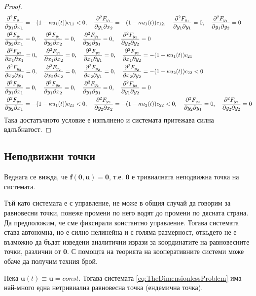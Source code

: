 \begin{proof}
{\begin{align*}
    &\pdv{F_{y_1}}{y_1}{x_1} = -(1-\kappa u_1(t))c_{11} < 0, \quad
    \pdv{F_{y_1}}{y_1}{x_2} = -(1-\kappa u_1(t))c_{12}, \quad
    \pdv{F_{y_1}}{y_1}{y_1} = 0, \quad
    \pdv{F_{y_1}}{y_1}{y_2} = 0 \\
    &\pdv{F_{y_1}}{y_2}{x_1} = 0, \quad
    \pdv{F_{y_1}}{y_2}{x_2} = 0, \quad
    \pdv{F_{y_1}}{y_2}{y_1} = 0, \quad
    \pdv{F_{y_1}}{y_2}{y_2} = 0 \\
    &\pdv{F_{y_2}}{x_1}{x_1} = 0, \quad
    \pdv{F_{y_2}}{x_1}{x_2} = 0, \quad
    \pdv{F_{y_2}}{x_1}{y_1} = 0, \quad
    \pdv{F_{y_2}}{x_1}{y_2} = -(1-\kappa u_1(t)) c_{21} \\
    &\pdv{F_{y_2}}{x_2}{x_1} = 0, \quad
    \pdv{F_{y_2}}{x_2}{x_2} = 0, \quad
    \pdv{F_{y_2}}{x_2}{y_1} = 0, \quad
    \pdv{F_{y_2}}{x_2}{y_2} = -(1-\kappa u_2(t)) c_{22} < 0 \\
    &\pdv{F_{y_2}}{y_1}{x_1} = 0, \quad
    \pdv{F_{y_2}}{y_1}{x_2} = 0, \quad
    \pdv{F_{y_2}}{y_1}{y_1} = 0, \quad
    \pdv{F_{y_2}}{y_1}{y_2} = 0 \\
    &\pdv{F_{y_2}}{y_2}{x_1} = -(1-\kappa u_1(t)) c_{21} < 0, \quad
    \pdv{F_{y_2}}{y_2}{x_2} = -(1-\kappa u_2(t)) c_{22} < 0, \quad
    \pdv{F_{y_2}}{y_2}{y_1} = 0, \quad
    \pdv{F_{y_2}}{y_2}{y_2} = 0
  \end{align*}
}
Така достатъчното условие е изпълнено и системата притежава силна вдлъбнатост.
\end{proof}


\subsection{Неподвижни точки}
Веднага се вижда, че $\mathbf{f}(\mathbf{0}, \mathbf{u}) = \mathbf{0}$, т.е. $\mathbf{0}$ е тривиалната неподвижна точка на системата.

Тъй като системата е с управление, не може в общия случай да говорим за равновесни точки, понеже промени по него водят до промени по дясната страна. Да предположим, че сме фиксирали константно управление. Тогава системата става автономна, но е силно нелинейна и с голяма размерност, откъдето не е възможно да бъдат изведени аналитични изрази за координатите на равновесните точки, различни от  $\mathbf{0}$. С помощта на теорията на кооперативните системи може обаче да получим техния брой.

\begin{proposition}
  Нека $\mathbf{u}(t)\equiv \mathbf{u}=const$. Тогава системата \ref{eq:TheDimensionlessProblem} има най-много една нетривиална равновесна точка (ендемична точка).
\end{proposition}


